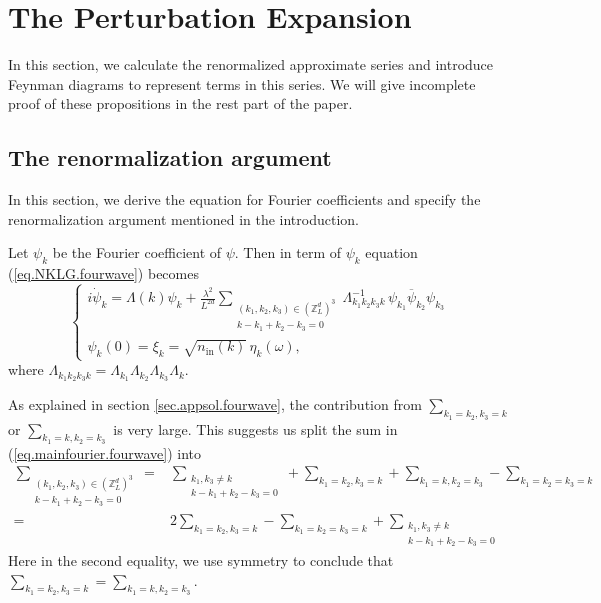 \section{The Perturbation Expansion}
In this section, we calculate the renormalized approximate series and introduce Feynman diagrams to represent terms in this series. We will give incomplete proof of these propositions in the rest part of the paper.


\subsection{The renormalization argument} In this section, we derive the equation for Fourier coefficients and specify the renormalization argument mentioned in the introduction.

Let $\psi_k$ be the Fourier coefficient of $\psi$. Then in term of $\psi_k$ equation (\ref{eq.NKLG.fourwave}) becomes
\begin{equation}\label{eq.mainfourier.fourwave}
\begin{cases}
 i \dot{\psi}_{k} = \Lambda(k) \psi_k
 +\frac{\lambda^2}{L^{2d}} \sum\limits_{\substack{(k_1,k_2,k_{3}) \in (\mathbb{Z}^d_L)^3 \\ k - k_1 + k_2 -k_3 = 0}} \Lambda_{k_1k_2k_3k}^{-1}\,\psi_{k_1}\overline{\psi}_{k_2} \psi_{k_3} \\[2em]
\psi_k(0) = \xi_k = \sqrt{n_{\textrm{in}}(k)} \, \eta_{k}(\omega),
\end{cases}
\end{equation}
where $\Lambda_{k_1k_2k_3k}=\Lambda_{k_1}\Lambda_{k_2}\Lambda_{k_3}\Lambda_{k}$.

As explained in section \ref{sec.appsol.fourwave}, the contribution from $\sum_{k_1=k_2,k_3=k}$ or $\sum_{k_1=k,k_2=k_3}$ is very large. This suggests us split the sum in (\ref{eq.mainfourier.fourwave}) into
\begin{equation}
\begin{split}
\sum\limits_{\substack{(k_1,k_2,k_{3}) \in (\mathbb{Z}^d_L)^3 \\ k - k_1 + k_2 -k_3 = 0}}
=&\sum_{\substack{k_1, k_3\neq k\\ k - k_1 + k_2 -k_3 = 0}}+\sum_{k_1=k_2,k_3=k}+\sum_{k_1=k,k_2=k_3}-\sum_{k_1=k_2=k_3=k}
\\
=&2\sum_{k_1=k_2,k_3=k}-\sum_{k_1=k_2=k_3=k} +\sum_{\substack{k_1, k_3\neq k\\ k - k_1 + k_2 -k_3 = 0}} 
\end{split}
\end{equation}
Here in the second equality, we use symmetry to conclude that $\sum_{k_1=k_2,k_3=k}=\sum_{k_1=k,k_2=k_3}$.

